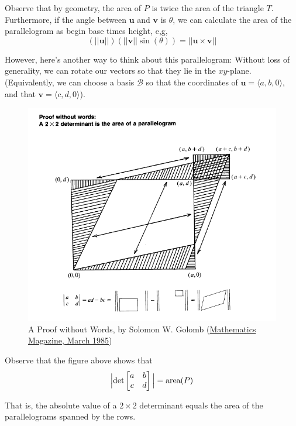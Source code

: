 Observe that by geometry, the area of $P$ is twice the area of the triangle $T$.  Furthermore, if the angle between $\bm{u}$ and $\bm{v}$ is $\theta$, we can calculate the area of the parallelogram as begin base times height, e,g, $$(||\bm{u}||)(||\bm{v}||\sin(\theta)) = ||\bm{u \times v}||$$

However, here's another way to think about this parallelogram: Without loss of generality, we can rotate our vectors so that they lie in the $xy$-plane.  (Equivalently, we can choose a basis $\mathcal{B}$ so that the coordinates of $\bm{u} = \langle a, b, 0 \rangle$, and that $\bm{v} = \langle c, d, 0 \rangle$).

\begin{figure}[H]
    \centering
    \includegraphics[scale=0.5]{images/2x2detproof.png}
    \caption{A Proof without Words, by Solomon W. Golomb (\href{https://www.tandfonline.com/doi/abs/10.1080/0025570X.1985.11977163}{Mathematics Magazine, March 1985})}
\end{figure}

Observe that the figure above shows that \begin{equation*}
        \Big|\textnormal{det}\begin{bmatrix}
a & b \\
c & d
\end{bmatrix}\Big| = \textnormal{area}(P)
    \end{equation*}
    
       That is, the absolute value of a $2 \times 2$
determinant equals the area of the parallelograms spanned by the rows.  


